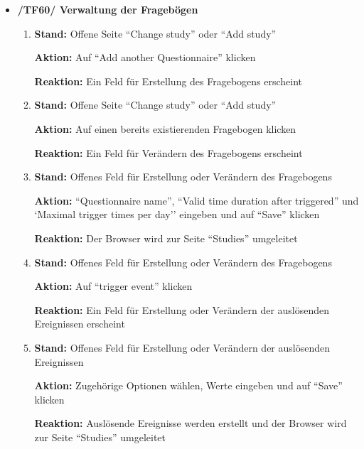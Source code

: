 \documentclass[a4paper]{scrreprt}
\begin{document}
\begin{itemize}
                \item \textbf{/TF60/ Verwaltung der Frageb\"ogen}
                    \begin{enumerate}
                        \item \par \textbf{Stand: }Offene Seite ``Change study'' oder ``Add study''
                              \par \textbf{Aktion: }Auf ``Add another Questionnaire'' klicken
                              \par \textbf{Reaktion: }Ein Feld f\"ur Erstellung des Fragebogens erscheint
						\item \par \textbf{Stand: }Offene Seite ``Change study'' oder ``Add study''
                              \par \textbf{Aktion: }Auf einen bereits existierenden Fragebogen klicken
                              \par \textbf{Reaktion: }Ein Feld f\"ur Ver\"andern des Fragebogens erscheint
                        \item \par \textbf{Stand: }Offenes Feld f\"ur Erstellung oder Ver\"andern des Fragebogens
                              \par \textbf{Aktion: }``Questionnaire name'', ``Valid time duration after triggered'' und `Maximal trigger times per day'' eingeben und auf ``Save'' klicken
                              \par \textbf{Reaktion: }Der Browser wird zur Seite ``Studies'' umgeleitet
                        \item \par \textbf{Stand: }Offenes Feld f\"ur Erstellung oder Ver\"andern des Fragebogens
                              \par \textbf{Aktion: }Auf ``trigger event'' klicken
                              \par \textbf{Reaktion: }Ein Feld f\"ur Erstellung oder Ver\"andern der ausl\"osenden Ereignissen erscheint
                        \item \par \textbf{Stand: }Offenes Feld f\"ur Erstellung oder Ver\"andern der ausl\"osenden Ereignissen
                              \par \textbf{Aktion: }Zugeh\"orige Optionen w\"ahlen, Werte eingeben und auf ``Save'' klicken
                              \par \textbf{Reaktion: }Ausl\"osende Ereignisse werden erstellt und der Browser wird zur Seite ``Studies'' umgeleitet

\end{enumerate}
\end{itemize}
\end{document}
